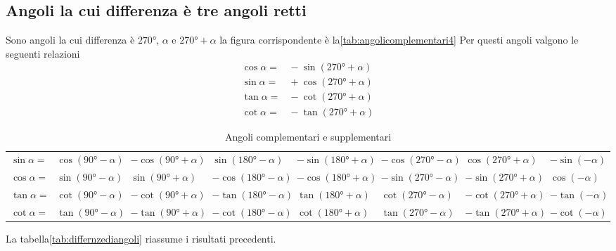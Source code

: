 \subsection{Angoli la cui differenza è tre angoli retti}
Sono angoli la cui differenza è $\ang{270}$, $\alpha$ e $\ang{270}+\alpha$ la figura corrispondente è la\nobs\vref{tab:angolicomplementari4}
%		
Per questi angoli valgono le seguenti relazioni
\begin{align*}
\cos\alpha=&{}-\sin(\ang{270}+\alpha)\\
\sin\alpha=&{}+\cos(\ang{270}+\alpha)\\
\tan\alpha=&{}-\cot(\ang{270}+\alpha)\\
\cot\alpha=&{}-\tan(\ang{270}+\alpha)
\end{align*}
\begin{table}
\centering
	\footnotesize
	\begin{tabular}{rlllllll}
	\toprule
	$\sin\alpha=$&$\cos(\ang{90}-\alpha)$&$-\cos(\ang{90}+\alpha)$&$\sin(\ang{180}-\alpha)$&$-\sin(\ang{180}+\alpha)$&$-\cos(\ang{270}-\alpha)$&$\cos(\ang{270}+\alpha)$&$-\sin(-\alpha)$\\[.6cm] 
	$\cos\alpha=$&$\sin(\ang{90}-\alpha)$&$\sin(\ang{90}+\alpha)$&$-\cos(\ang{180}-\alpha)$&$-\cos(\ang{180}+\alpha)$&$-\sin(\ang{270}-\alpha)$&$-\sin(\ang{270}+\alpha)$&$\cos(-\alpha)$\\[.6cm] 
	$\tan\alpha=$&$\cot(\ang{90}-\alpha)$&$-\cot(\ang{90}+\alpha)$&$-\tan(\ang{180}-\alpha)$&$\tan(\ang{180}+\alpha)$&$\cot(\ang{270}-\alpha)$&$-\cot(\ang{270}+\alpha)$&$-\tan(-\alpha)$\\[.6cm] 
	$\cot\alpha=$&$\tan(\ang{90}-\alpha)$&$-\tan(\ang{90}+\alpha)$&$-\cot(\ang{180}-\alpha)$&$\cot(\ang{180}+\alpha)$&$\tan(\ang{270}-\alpha)$&$-\tan(\ang{270}+\alpha)$&$-\cot(-\alpha)$\\[.6cm]
	\bottomrule
	\end{tabular}
	\caption{Angoli complementari e supplementari}\label{tab:differnzediangoli}
\end{table}
La tabella\nobs\vref{tab:differnzediangoli} riassume i risultati precedenti.

